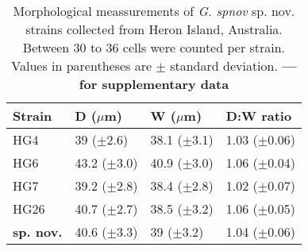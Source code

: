 \documentclass[12pt]{article}
\begin{document}
\FloatBarrier
\begin{table}
\caption{Morphological meassurements of \emph{G. spnov }sp. nov. strains collected from Heron Island, Australia. Between 30 to 36 cells were counted per strain. Values in parentheses are $\pm$ standard deviation. \textbf{--- for supplementary data}}
\label{tbl:SizeTable}
\begin{tabular}{ | p{2cm} | p{2.5cm} | p{2.5cm} | p{2.5cm} | }
\hline
 \textbf{Strain} & \textbf{D ($\mu$m)} & \textbf{W ($\mu$m)}  & \textbf{D:W ratio}  \\
 \hline
 HG4  & 39 ($\pm$2.6) & 38.1 ($\pm$3.1) & 1.03 ($\pm$0.06) \\

 HG6  & 43.2 ($\pm$3.0) & 40.9 ($\pm$3.0) & 1.06 ($\pm$0.04)  \\

 HG7  & 39.2 ($\pm$2.8) & 38.4 ($\pm$2.8) & 1.02 ($\pm$0.07)  \\

 HG26  & 40.7 ($\pm$2.7) & 38.5 ($\pm$3.2) & 1.06 ($\pm$0.05) \\
  \hline
\textbf{sp. nov.}  & 40.6 ($\pm$3.3) & 39 ($\pm$3.2) & 1.04 ($\pm$0.06) \\
 \hline
\end{tabular}
\end{table}
\FloatBarrier

\newpage


\end{document}
